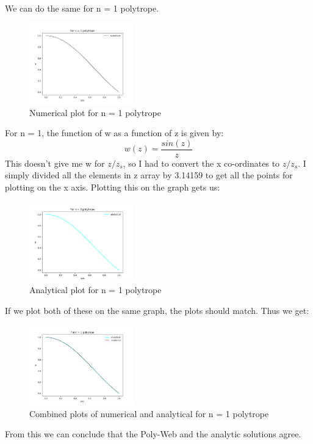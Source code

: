 \documentclass[10pt]{article}
\begin{document}
We can do the same for n = 1 polytrope.

\begin{figure}[H]
    \centering
    \includegraphics[width=0.4\textwidth]{polytrope_n_1_numerical.png}
    \caption{Numerical plot for n = 1 polytrope}
    \label{fig:enter-label}
\end{figure}

For n = 1, the function of w as a function of z is given by:
\[ w(z) = \frac{sin(z)}{z}\]
This doesn't give me w for $z/z_{s}$, so I had to convert the x co-ordinates to $z/z_{s}$. I simply divided all the elements in z array by 3.14159 to get all the points for plotting on the x axis. Plotting this on the graph gets us:

\begin{figure}[H]
    \centering
    \includegraphics[width=0.4\textwidth]{polytrope_n_1_analytical.png}
    \caption{Analytical plot for n = 1 polytrope}
    \label{fig:enter-label}
\end{figure}

If we plot both of these on the same graph, the plots should match. Thus we get:

\begin{figure}[H]
    \centering
    \includegraphics[width=0.4\textwidth]{polytrope_n_1.png}
    \caption{Combined plots of numerical and analytical for n = 1 polytrope}
    \label{fig:enter-label}
\end{figure}

From this we can conclude that the Poly-Web and the analytic solutions agree. 
\end{document}
